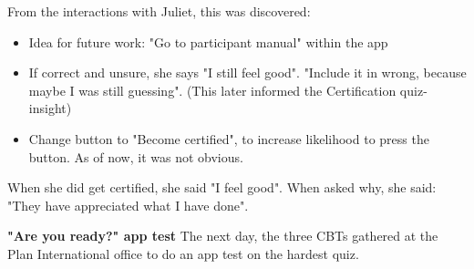 
    From the interactions with Juliet, this was discovered:

    \begin{itemize}
    \item Idea for future work: "Go to participant manual" within the app
    \item If correct and unsure, she says "I still feel good". "Include it in wrong, because maybe I was still guessing". (This later informed the Certification quiz-insight)
    \item Change button to "Become certified", to increase likelihood to press the button. As of now, it was not obvious.
    \end{itemize}

    When she did get certified, she said "I feel good". When asked why, she said: "They have appreciated what I have done".

    \textbf{"Are you ready?" app test}
    The next day, the three CBTs gathered at the Plan International office to do an app test on the hardest quiz.


